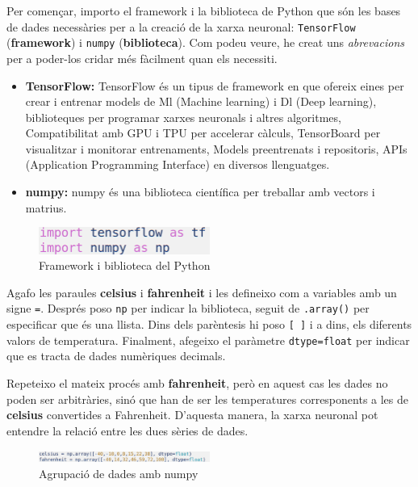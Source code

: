Per començar, importo el framework i la biblioteca de Python que són les bases de dades necessàries per a la creació de la xarxa neuronal: \texttt{TensorFlow} (\textbf{framework}) i \texttt{{numpy}} (\textbf{biblioteca}). Com podeu veure, he creat uns \textit{abrevacions} per a poder-los cridar més fàcilment quan els necessiti.

\begin{itemize}
 \item \textbf{TensorFlow: } TensorFlow és un tipus de framework en que ofereix eines per crear i entrenar models de Ml (Machine learning) i Dl (Deep learning), biblioteques per programar xarxes neuronals i altres algoritmes, Compatibilitat amb GPU i TPU per accelerar càlculs, TensorBoard per visualitzar i monitorar entrenaments, Models preentrenats i repositoris, APIs (Application Programming Interface) en diversos llenguatges.
 \item \textbf{numpy: } numpy és una biblioteca científica per treballar amb vectors i matrius.
\end{itemize}
\begin{figure}[H]
    \centering
    \includegraphics[width=0.5\textwidth]{./figures/1.png}
    \caption{Framework i biblioteca del Python}
\end{figure}


Agafo les paraules \textbf{celsius} i \textbf{fahrenheit} i les defineixo com a variables amb un signe \texttt{=}. Després poso \texttt{np} per indicar la biblioteca, seguit de \texttt{.array()} per especificar que és una llista. Dins dels parèntesis hi poso \texttt{[ ]} i a dins, els diferents valors de temperatura. Finalment, afegeixo el paràmetre \texttt{dtype=float} per indicar que es tracta de dades numèriques decimals.

Repeteixo el mateix procés amb \textbf{fahrenheit}, però en aquest cas les dades no poden ser arbitràries, sinó que han de ser les temperatures corresponents a les de \textbf{celsius} convertides a Fahrenheit. D’aquesta manera, la xarxa neuronal pot entendre la relació entre les dues sèries de dades.


\begin{figure}[H]
    \centering
    \includegraphics[width=0.5\textwidth]{./figures/2.png}
    \caption{Agrupació de dades amb numpy}
\end{figure}

